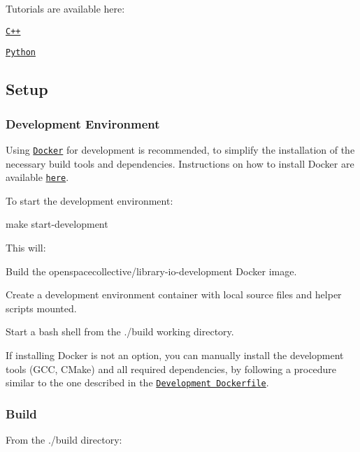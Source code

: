 Tutorials are available here\+:


\begin{DoxyItemize}
\item \href{./tutorials/cpp}{\tt C++}
\item \href{./tutorials/python}{\tt Python}
\end{DoxyItemize}

\subsection*{Setup}

\subsubsection*{Development Environment}

Using \href{https://www.docker.com}{\tt Docker} for development is recommended, to simplify the installation of the necessary build tools and dependencies. Instructions on how to install Docker are available \href{https://docs.docker.com/install/}{\tt here}.

To start the development environment\+:


\begin{DoxyCode}
make start-development
\end{DoxyCode}


This will\+:


\begin{DoxyEnumerate}
\item Build the {\ttfamily openspacecollective/library-\/io-\/development} Docker image.
\item Create a development environment container with local source files and helper scripts mounted.
\item Start a {\ttfamily bash} shell from the {\ttfamily ./build} working directory.
\end{DoxyEnumerate}

If installing Docker is not an option, you can manually install the development tools (G\+CC, C\+Make) and all required dependencies, by following a procedure similar to the one described in the \href{./docker/development/Dockerfile}{\tt Development Dockerfile}.

\subsubsection*{Build}

From the {\ttfamily ./build} directory\+:


